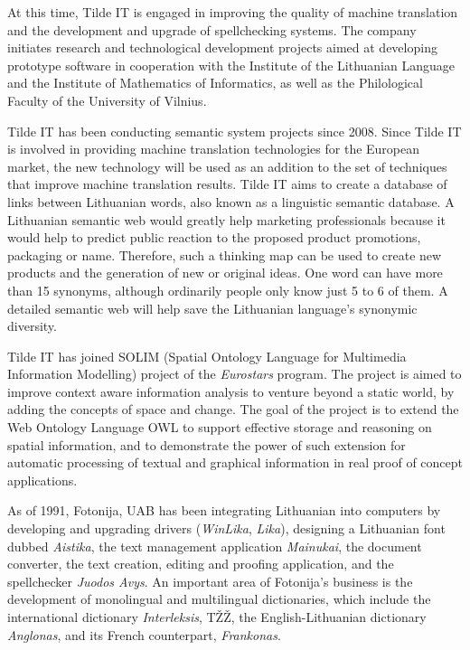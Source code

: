 \begin{multicols}{2}
    At this time, Tilde IT is engaged in improving the quality of machine translation and the development and upgrade of spellchecking systems. The company initiates research and technological development projects aimed at developing prototype software in cooperation with the Institute of the Lithuanian Language and the Institute of Mathematics of Informatics, as well as the Philological Faculty of the University of Vilnius.

    Tilde IT has been conducting semantic system projects since 2008. Since Tilde IT is involved in providing machine translation technologies for the European market, the new technology will be used as an addition to the set of techniques that improve machine translation results. Tilde IT aims to create a database of links between Lithuanian words, also known as a linguistic semantic database. A Lithuanian semantic web would greatly help marketing professionals because it would help to predict public reaction to the proposed product promotions, packaging or name. Therefore, such a thinking map can be used to create new products and the generation of new or original ideas. One word can have more than 15 synonyms, although ordinarily people only know just 5 to 6 of them. A detailed semantic web will help save the Lithuanian language’s synonymic diversity. 

Tilde IT has joined SOLIM (Spatial Ontology Language for Multimedia Information Modelling) project of the \textit{Eurostars} program. The project is aimed to improve context aware information analysis to venture beyond a static world, by adding the concepts of space and change. The goal of the project is to extend the Web Ontology Language OWL to support effective storage and reasoning on spatial information, and to demonstrate the power of such extension for automatic processing of textual and graphical information in real proof of concept applications. 

As of 1991, Fotonija, UAB has been integrating Lithuanian into computers by developing and upgrading drivers (\textit{WinLika}, \textit{Lika}), designing a Lithuanian font dubbed \textit{Aistika}, the text management application \textit{Mainukai}, the document converter, the text creation, editing and proofing application, and the spellchecker \textit{Juodos Avys}. An important area of Fotonija’s business is the development of monolingual and multilingual dictionaries, which include the international dictionary \textit{Interleksis}, TŽŽ, the English-Lithuanian dictionary \textit{Anglonas}, and its French counterpart, \textit{Frankonas}.  


\end{multicols}
